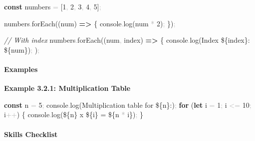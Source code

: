 \documentclass[
  justified,
  openright,
]{tufte-book}
\let\subsection\paragraph
\let\paragraph\paragraph
\newcommand{\KeywordTok}[1]{\textcolor{CodeKeyword}{\textbf{#1}}}  %
\newcommand{\StringTok}[1]{\textcolor{CodeString}{#1}}              %
\newcommand{\CommentTok}[1]{\textcolor{CodeComment}{\textit{#1}}}  %
\newcommand{\CodeNumTok}[1]{\textcolor{CodeNumber}{#1}}             %
\newcommand{\CodeFuncTok}[1]{\textcolor{CodeKeyword}{#1}}           %
\newcommand{\OperatorTok}[1]{\textcolor{DarkGray}{#1}}              %
\newenvironment{Shaded}{%
  \begin{mdframed}[style=TufteCode]%
}{%
  \end{mdframed}%
}
\let\subsection\paragraph
\let\paragraph\paragraph
\begin{document}
\begin{Shaded}
\begin{Highlighting}[]
\KeywordTok{const} numbers \OperatorTok{=} [\CodeNumTok{1}\OperatorTok{,} \CodeNumTok{2}\OperatorTok{,} \CodeNumTok{3}\OperatorTok{,} \CodeNumTok{4}\OperatorTok{,} \CodeNumTok{5}]\OperatorTok{;}
 
numbers\OperatorTok{.}\CodeFuncTok{forEach}((num) \KeywordTok{=\textgreater{}} \{
  console\OperatorTok{.}\CodeFuncTok{log}(num \OperatorTok{*} \CodeNumTok{2})\OperatorTok{;}
\})\OperatorTok{;}
 
\CommentTok{// With index}
numbers\OperatorTok{.}\CodeFuncTok{forEach}((num\OperatorTok{,} index) \KeywordTok{=\textgreater{}} \{
  console\OperatorTok{.}\CodeFuncTok{log}(\StringTok{\textasciigrave{}Index }\StringTok{\$\{}index\StringTok{\}}\StringTok{: }\StringTok{\$\{}num\StringTok{\}}\StringTok{\textasciigrave{}})\OperatorTok{;}
)\OperatorTok{;}
\end{Highlighting}
\end{Shaded}

\subsection{Examples}\label{examples-17}

\textbf{Example 3.2.1: Multiplication Table}

\begin{Shaded}
\begin{Highlighting}[]
\KeywordTok{const} n \OperatorTok{=} \CodeNumTok{5}\OperatorTok{;}
console\OperatorTok{.}\CodeFuncTok{log}(\StringTok{\textasciigrave{}Multiplication table for }\StringTok{\$\{}n\StringTok{\}}\StringTok{:\textasciigrave{}})\OperatorTok{;}
\KeywordTok{for} (\KeywordTok{let} i \OperatorTok{=} \CodeNumTok{1}\OperatorTok{;} i \OperatorTok{\textless{}=} \CodeNumTok{10}\OperatorTok{;} i\OperatorTok{++}) \{
  console\OperatorTok{.}\CodeFuncTok{log}(\StringTok{\textasciigrave{}}\StringTok{\$\{}n\StringTok{\}}\StringTok{ x }\StringTok{\$\{}i\StringTok{\}}\StringTok{ = }\StringTok{\$\{}n \OperatorTok{*} i\StringTok{\}}\StringTok{\textasciigrave{}})\OperatorTok{;}
\}
\end{Highlighting}
\end{Shaded}

\subsection{Skills Checklist}\label{skills-checklist-58}
\end{document}
